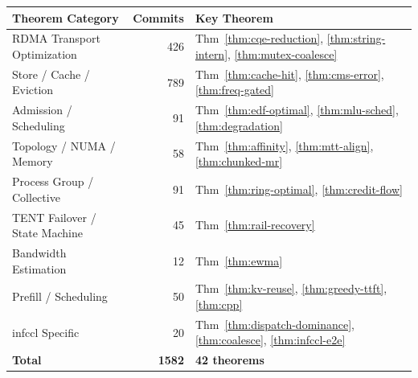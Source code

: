 \documentclass[11pt,a4paper,twoside]{article}
\theoremstyle{plain}
\theoremstyle{definition}
\theoremstyle{remark}
\begin{document}
\begin{center}
\begin{tabular}{lrl}
\toprule
\textbf{Theorem Category} & \textbf{Commits} & \textbf{Key Theorem} \\
\midrule
RDMA Transport Optimization & 426 & Thm~\ref{thm:cqe-reduction}, \ref{thm:string-intern}, \ref{thm:mutex-coalesce} \\
Store / Cache / Eviction & 789 & Thm~\ref{thm:cache-hit}, \ref{thm:cms-error}, \ref{thm:freq-gated} \\
Admission / Scheduling & 91 & Thm~\ref{thm:edf-optimal}, \ref{thm:mlu-sched}, \ref{thm:degradation} \\
Topology / NUMA / Memory & 58 & Thm~\ref{thm:affinity}, \ref{thm:mtt-align}, \ref{thm:chunked-mr} \\
Process Group / Collective & 91 & Thm~\ref{thm:ring-optimal}, \ref{thm:credit-flow} \\
TENT Failover / State Machine & 45 & Thm~\ref{thm:rail-recovery} \\
Bandwidth Estimation & 12 & Thm~\ref{thm:ewma} \\
Prefill / Scheduling & 50 & Thm~\ref{thm:kv-reuse}, \ref{thm:greedy-ttft}, \ref{thm:cpp} \\
infccl Specific & 20 & Thm~\ref{thm:dispatch-dominance}, \ref{thm:coalesce}, \ref{thm:infccl-e2e} \\
\midrule
\textbf{Total} & \textbf{1582} & \textbf{42 theorems} \\
\bottomrule
\end{tabular}
\end{center}
\end{document}
